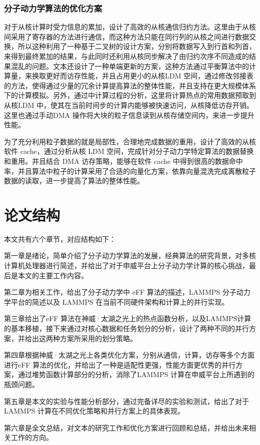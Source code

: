 \subsubsection{分子动力学算法的优化方案}
对于从核计算时受力信息的累加，设计了高效的从核通信归约方法。这里由于从核间采用了寄存器的方法进行通信，而这种方法只能在同行列的从核之间进行数据交换，所以这种利用了一种基于二叉树的设计方案，分别将数据写入到行首和列首，来得到最终累加的结果，与此同时还利用从核同步解决了由归约次序不同造成的结果混乱的问题。文本还设计了一种单端更新的方案，这种方法通过平衡算法中的计算量，来换取更好而访存性能，并且占用更小的从核LDM 空间，通过修改邻接表的方法，使得通过少量的冗余计算提高算法的整体性能，并且支持在更大规模体系下的计算模拟。另外，通过中计算过程的分析，这里将计算热点的常用数据预取到从核LDM 中，使其在当前时间步的计算内能够被快速访问，从核降低访存开销。这里也通过手动DMA 操作将大块的粒子信息读到从核存储空间内，来进一步提升性能。

为了充分利用粒子数据的就是局部性，合理地完成数据的重用，设计了高效的从核软件 cache，通过分析从核 LDM 空间，完成针对分子动力学特定算法的数据替换和重用。并且结合 DMA 访存策略，能够在软件 cache 中得到很高的数据命中率，并且算法中粒子的计算采用了合适的向量化方案，依靠向量混洗完成离散粒子数据的读取，进一步提高了算法的整体性能。

\section{论文结构}
本文共有六个章节，对应结构如下：

第一章是绪论，简单介绍了分子动力学算法的发展，经典算法的研究背景，对多核计算机处理器进行简述，并给出了对于申威平台上分子动力学计算的核心挑战，最后是本文的主要工作内容。

第二章为相关工作，给出了分子动力学中 eFF 算法的描述，LAMMPS 分子动力学平台的简述以及 LAMMPS 在当前不同硬件架构和计算上的并行实现。

第三章给出了eFF 算法在神威·太湖之光上的热点函数分析，以及LAMMPS计算的基本移植，接下来通过对核心数据和任务划分的分析，设计了两种不同的并行方案，并给出这两种方案所采用的划分策略。

第四章根据神威·太湖之光上各类优化方案，分别从通信，计算，访存等多个方面进行eFF 算法的优化，并给出了一种是适配性更强，性能方面更优秀的并行方案，通过堆势函数计算部分的分析，消除了LAMMPS 计算在申威平台上所遇到的瓶颈问题。

第五章是本文的实验与性能分析部分，通过完备详尽的实验和测试，给出了对于 LAMMPS 计算在不同优化策略和并行方案上的具体表现。

第六章是全文总结，对文本的研究工作和优化方案进行回顾和总结，并给出未来相关工作的方向。

